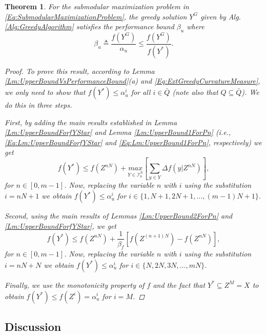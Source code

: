 \documentclass[conference]{IEEEtran}
\newtheorem{theorem}{Theorem}
\begin{document}
\begin{theorem}\label{Th:MainTheorem}
For the submodular maximization problem in \eqref{Eq:SubmodularMaximizationProblem}, the greedy solution $Y^G$ given by Alg. \ref{Alg:GreedyAlgorithm} satisfies the performance bound $\beta_u$ where 
\begin{equation}\label{Eq:Th:MainTheorem}
\beta_u \triangleq \frac{f(Y^G)}{\alpha_u} \leq \frac{f(Y^G)}{f(Y^*)}. 
\end{equation}
\begin{proof}
To prove this result, according to Lemma \ref{Lm:UpperBoundVsPerformanceBound}(a) and \eqref{Eq:ExtGreedyCurvatureMeasure}, we only need to show that $f(Y^*) \leq \alpha_u^i$ for all $i \in \bar{Q}$ (note also that $Q\subseteq \bar{Q}$). We do this in three steps.

First, by adding the main results established in Lemma \ref{Lm:UpperBoundForfYStar} and Lemma \ref{Lm:UpperBound1ForPn} (i.e., \eqref{Eq:Lm:UpperBoundForfYStar} and \eqref{Eq:Lm:UpperBound1ForPn}, respectively) we get 
\begin{equation}
    f(Y^*) \leq f(Z^{nN}) +  \underset{Y\in\mathcal{I}^N_n}{max} \left[ \sum_{y\in Y} \Delta f(y\vert Z^{nN}) \right],
\end{equation}
for $n\in[0,m-1]$. Now, replacing the variable $n$ with $i$ using the substitution $i=nN+1$ we obtain $f(Y^*) \leq \alpha^i_u$ for $i\in\{1,N+1,2N+1,\ldots,(m-1)N+1\}$.

Second, using the main results of Lemmas \ref{Lm:UpperBound2ForPn} and \ref{Lm:UpperBoundForfYStar}, we get
\begin{equation}
    f(Y^*) \leq f(Z^{nN}) + \frac{1}{\beta_f}\left[ f(Z^{(n+1)N})-f(Z^{nN})\right],
\end{equation}
for $n\in[0,m-1]$. Now, replacing the variable $n$ with $i$ using the substitution $i=nN+N$ we obtain $f(Y^*) \leq \alpha^i_u$ for $i\in\{N,2N,3N,\ldots,mN\}$.

Finally, we use the monotonicity property of $f$ and the fact that $Y^* \subseteq Z^M=X$ to obtain $f(Y^*) \leq f(Z^i) = \alpha^i_u$ for $i=M$. 
\end{proof}
\end{theorem}





\subsection{Discussion}
\end{document}
